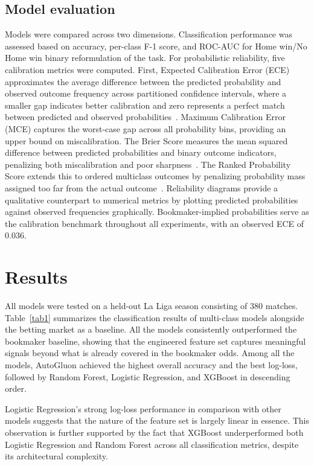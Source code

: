 \documentclass[conference]{IEEEtran}
\begin{document}
\subsection{Model evaluation}
Models were compared across two dimensions. Classification
performance was assessed based on accuracy, per-class F-1
score, and ROC-AUC for Home win/No Home win binary
reformulation of the task. For probabilistic reliability, five
calibration metrics were computed. First, Expected Calibration
Error (ECE) approximates the average difference between
the predicted probability and observed outcome frequency
across partitioned confidence intervals, where a smaller gap
indicates better calibration and zero represents a perfect match
between predicted and observed probabilities~\cite{b9}.
Maximum Calibration Error (MCE) captures the worst-case gap
across all probability bins, providing an upper bound on
miscalibration. The Brier Score measures the mean squared
difference between predicted probabilities and binary outcome
indicators, penalizing both miscalibration and poor
sharpness~\cite{b7}. The Ranked Probability Score extends this
to ordered multiclass outcomes by penalizing probability mass
assigned too far from the actual outcome~\cite{b8}. Reliability
diagrams provide a qualitative counterpart to numerical metrics
by plotting predicted probabilities against observed frequencies
graphically. Bookmaker-implied probabilities serve as the
calibration benchmark throughout all experiments, with an
observed ECE of 0.036.

\section{Results}
All models were tested on a held-out La Liga season consisting
of 380 matches. Table~\ref{tab1} summarizes the classification
results of multi-class models alongside the betting market as a
baseline. All the models consistently outperformed the bookmaker baseline, showing that the engineered feature set captures
meaningful signals beyond what is already covered in the
bookmaker odds. Among all the models, AutoGluon achieved the
highest overall accuracy and the best log-loss, followed by
Random Forest, Logistic Regression, and XGBoost in descending
order.

Logistic Regression's strong log-loss performance in comparison
with other models suggests that the nature of the feature set
is largely linear in essence. This observation is further
supported by the fact that XGBoost underperformed both Logistic
Regression and Random Forest across all classification metrics,
despite its architectural complexity.
\end{document}
